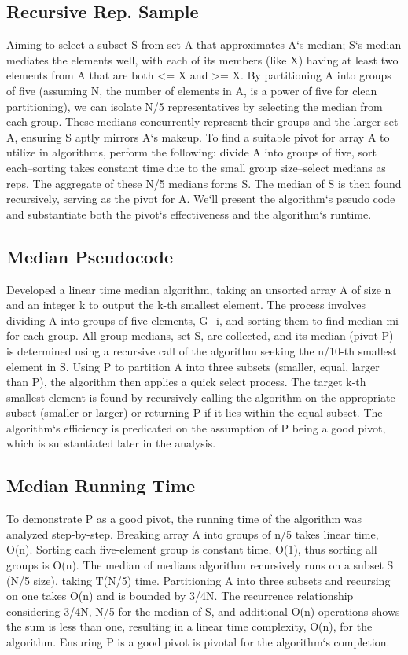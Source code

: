 \subsection*{Recursive Rep.
Sample}
Aiming to select a subset S from set A that approximates A`s median; S`s median mediates the elements well, with each of its members (like X) having at least two elements from A that are both \textless{}= X and \textgreater{}= X\@.
By partitioning A into groups of five (assuming N, the number of elements in A, is a power of five for clean partitioning), we can isolate N/5 representatives by selecting the median from each group.
These medians concurrently represent their groups and the larger set A, ensuring S aptly mirrors A`s makeup.
To find a suitable pivot for array A to utilize in algorithms, perform the following: divide A into groups of five, sort each--sorting takes constant time due to the small group size--select medians as reps.
The aggregate of these N/5 medians forms S\@.
The median of S is then found recursively, serving as the pivot for A\@.
We`ll present the algorithm`s pseudo code and substantiate both the pivot`s effectiveness and the algorithm`s runtime.

\subsection*{Median  Pseudocode}
Developed a linear time median algorithm, taking an unsorted array A of size n and an integer k to output the k-th smallest element.
The process involves dividing A into groups of five elements, G\_i, and sorting them to find median mi for each group.
All group medians, set S, are collected, and its median (pivot P) is determined using a recursive call of the algorithm seeking the n/10-th smallest element in S\@.
Using P to partition A into three subsets (smaller, equal, larger than P), the algorithm then applies a quick select process.
The target k-th smallest element is found by recursively calling the algorithm on the appropriate subset (smaller or larger) or returning P if it lies within the equal subset.
The algorithm`s efficiency is predicated on the assumption of P being a good pivot, which is substantiated later in the analysis.

\subsection*{Median  Running Time}
To demonstrate P as a good pivot, the running time of the algorithm was analyzed step-by-step.
Breaking array A into groups of n/5 takes linear time, O(n).
Sorting each five-element group is constant time, O(1), thus sorting all groups is O(n).
The median of medians algorithm recursively runs on a subset S (N/5 size), taking T(N/5) time.
Partitioning A into three subsets and recursing on one takes O(n) and is bounded by 3/4N\@.
The recurrence relationship considering 3/4N, N/5 for the median of S, and additional O(n) operations shows the sum is less than one, resulting in a linear time complexity, O(n), for the algorithm.
Ensuring P is a good pivot is pivotal for the algorithm`s completion.

